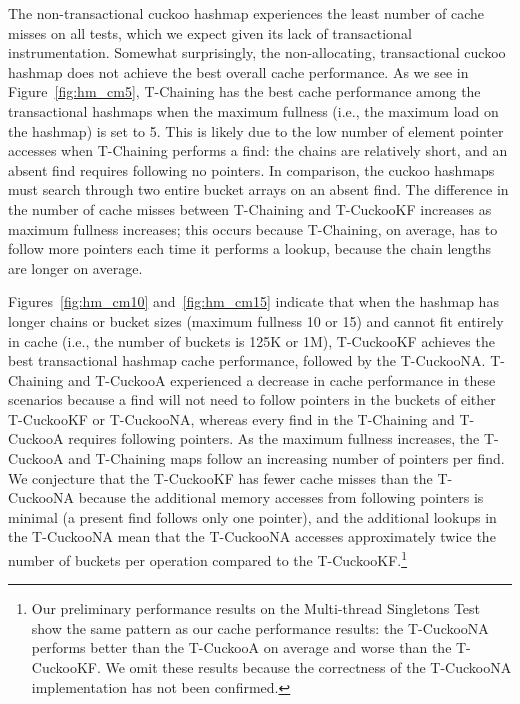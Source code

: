 The non-transactional cuckoo hashmap experiences the least number of cache misses on all tests, which we expect given its lack of transactional instrumentation. Somewhat surprisingly, the non-allocating, transactional cuckoo hashmap does not achieve the best overall cache performance. 
As we see in Figure~\ref{fig:hm_cm5}, T-Chaining has the best cache performance among the transactional hashmaps when the maximum fullness (i.e., the maximum load on the hashmap) is set to 5. This is likely due to the low number of element pointer accesses when T-Chaining performs a find: the chains are relatively short, and an absent find requires following no pointers. In comparison, the cuckoo hashmaps must search through two entire bucket arrays on an absent find. The difference in the number of cache misses between T-Chaining and T-CuckooKF increases as maximum fullness increases; this occurs because T-Chaining, on average, has to follow more pointers each time it performs a lookup, because the chain lengths are longer on average.

Figures~\ref{fig:hm_cm10} and~\ref{fig:hm_cm15} indicate that when the hashmap has longer chains or bucket sizes (maximum fullness 10 or 15) and cannot fit entirely in cache (i.e., the number of buckets is 125K or 1M), T-CuckooKF achieves the best transactional hashmap cache performance, followed by the T-CuckooNA. 
T-Chaining and T-CuckooA experienced a decrease in cache performance in these scenarios because a find will not need to follow pointers in the buckets of either T-CuckooKF or T-CuckooNA, whereas every find in the T-Chaining and T-CuckooA requires following pointers. As the maximum fullness increases, the T-CuckooA and T-Chaining maps follow an increasing number of pointers per find.
We conjecture that the T-CuckooKF has fewer cache misses than the T-CuckooNA because the additional memory accesses from following pointers is minimal (a present find follows only one pointer), and the additional lookups in the T-CuckooNA mean that the T-CuckooNA accesses approximately twice the number of buckets per operation compared to the T-CuckooKF.\footnote{Our preliminary performance results on the Multi-thread Singletons Test show the same pattern as our cache performance results: the T-CuckooNA performs better than the T-CuckooA on average and worse than the T-CuckooKF. We omit these results because the correctness of the T-CuckooNA implementation has not been confirmed.}

\vspace{12pt}
\noindent{}

